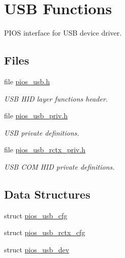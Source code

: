 \hypertarget{group___p_i_o_s___u_s_b}{\section{U\-S\-B Functions}
\label{group___p_i_o_s___u_s_b}
}


P\-I\-O\-S interface for U\-S\-B device driver.  


\subsection*{Files}
\begin{DoxyCompactItemize}
\item 
file \hyperlink{pios__usb_8h}{pios\-\_\-usb.\-h}
\begin{DoxyCompactList}\small\item\em U\-S\-B H\-I\-D layer functions header. \end{DoxyCompactList}\item 
file \hyperlink{pios__usb__priv_8h}{pios\-\_\-usb\-\_\-priv.\-h}
\begin{DoxyCompactList}\small\item\em U\-S\-B private definitions. \end{DoxyCompactList}\item 
file \hyperlink{pios__usb__rctx__priv_8h}{pios\-\_\-usb\-\_\-rctx\-\_\-priv.\-h}
\begin{DoxyCompactList}\small\item\em U\-S\-B C\-O\-M H\-I\-D private definitions. \end{DoxyCompactList}\end{DoxyCompactItemize}
\subsection*{Data Structures}
\begin{DoxyCompactItemize}
\item 
struct \hyperlink{structpios__usb__cfg}{pios\-\_\-usb\-\_\-cfg}
\item 
struct \hyperlink{structpios__usb__rctx__cfg}{pios\-\_\-usb\-\_\-rctx\-\_\-cfg}
\item 
struct \hyperlink{structpios__usb__dev}{pios\-\_\-usb\-\_\-dev}
\end{DoxyCompactItemize}

